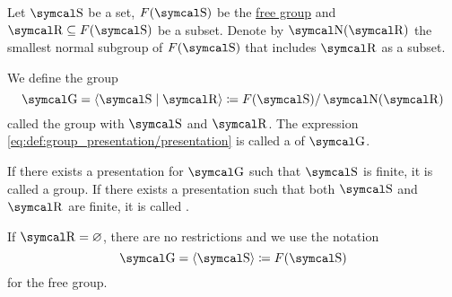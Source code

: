 \begin{definition}\label{def:group_presentation}
  Let \( \CS \) be a set, \( F(\CS) \) be the \hyperref[def:free_group]{free group} and \( \CR \subseteq F(\CS) \) be a subset. Denote by \( \CN(\CR) \) the smallest normal subgroup of \( F(\CS) \) that includes \( \CR \) as a subset.

  We define the group
  \begin{equation}\label{eq:def:group_presentation/presentation}
    \CG = \Braket{ \CS \mid \CR} \coloneqq F(\CS) / \CN(\CR)
  \end{equation}
  called the group with  \( \CS \) and  \( \CR \). The expression \eqref{eq:def:group_presentation/presentation} is called a  of \( \CG \).

  If there exists a presentation for \( \CG \) such that \( \CS \) is finite, it is called a  group. If there exists a presentation such that both \( \CS \) and \( \CR \) are finite, it is called .

  If \( \CR = \varnothing \), there are no restrictions and we use the notation
  \begin{equation}\label{eq:def:group_presentation/free}
    \CG = \Braket{ \CS } \coloneqq F(\CS)
  \end{equation}
  for the free group.
\end{definition}

